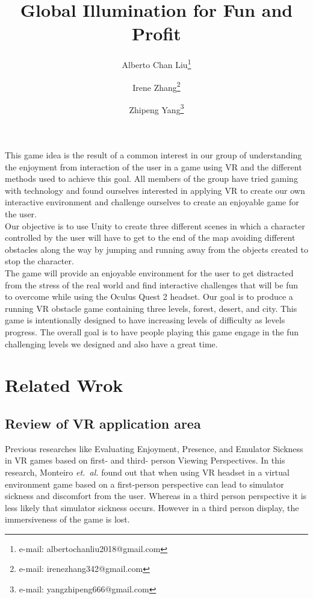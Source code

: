 \documentclass{vgtc}                          %
\title{Global Illumination for Fun and Profit}
\author{Alberto Chan Liu\thanks{e-mail: albertochanliu2018@gmail.com}\\ %
\and Irene Zhang\thanks{e-mail: irenezhang342@gmail.com}\\ %
\and Zhipeng Yang\thanks{e-mail: yangzhipeng666@gmail.com}\\ %
     }
\begin{document}


\maketitle
This game idea is the result of a common interest in our group of understanding the enjoyment from interaction of the user in a game using VR and the different methods used to achieve this goal. All members of the group have tried gaming with technology and found ourselves interested in applying VR to create our own interactive environment and challenge ourselves to create an enjoyable game for the user. 			
\\
Our objective is to use Unity to create three different scenes in which a character controlled by the user will have to get to the end of the map avoiding different obstacles along the way by jumping and running away from the objects created to stop the character. 
\\
The game will provide an enjoyable environment for the user to get distracted from the stress of the real world and find interactive challenges that will be fun to overcome while using the Oculus Quest 2 headset. Our goal is to produce a running VR obstacle game containing three levels, forest, desert, and city. This game is intentionally designed to have increasing levels of difficulty as levels progress. The overall goal is to have people playing this game engage in the fun challenging levels we designed and also have a great time.
 



\section{Related Wrok}
\subsection*{Review of VR application area}
Previous researches like {E}valuating {E}njoyment, {P}resence, and {E}mulator {S}ickness in VR games based on first- and third- person {V}iewing {P}erspectives. In this research, Monteiro \emph{et.~al.}\cite{monteiro_liang_xu_brucker_nanjappan_yue_2018} found out that when using VR headset in a virtual environment game based on a first-person perspective can lead to simulator sickness and discomfort from the user. Whereas in a third person perspective it is less likely that simulator sickness occurs. However in a third person display, the immersiveness of the game is lost.
\end{document}
